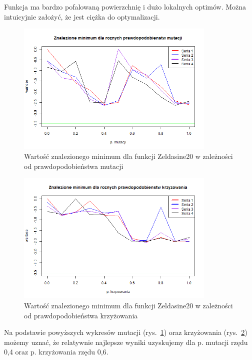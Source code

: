\documentclass[11pt, a4paper]{article}
\newcommand{\fbi}{\leavevmode{\parindent=1em\indent}}
\begin{document}
\fbi
Funkcja ma bardzo pofalowaną powierzchnię i dużo lokalnych optimów. Można intuicyjnie założyć, że jest ciężka do optymalizacji.

\begin{figure}[H]
	\begin{center}
		\includegraphics[width=0.85\textwidth]{./assets/Zeldasine202.png}
		\caption{Wartość znalezionego minimum dla funkcji Zeldasine20 w zależności od prawdopodobieństwa mutacji}
		\label{fig:zeldasine2}
	\end{center}
\end{figure}

\begin{figure}[H]
	\begin{center}
		\includegraphics[width=0.85\textwidth]{./assets/Zeldasine203.png}
		\caption{Wartość znalezionego minimum dla funkcji Zeldasine20 w zależności od prawdopodobieństwa krzyżowania}
		\label{fig:zeldasine3}
	\end{center}
\end{figure}

\fbi
Na podstawie powyższych wykresów mutacji (rys.~\ref{fig:zeldasine2}) oraz krzyżowania (rys.~\ref{fig:zeldasine3}) możemy uznać, że relatywnie najlepsze wyniki uzyskujemy dla p. mutacji rzędu 0,4 oraz p. krzyżowania rzędu 0,6.
\end{document}
